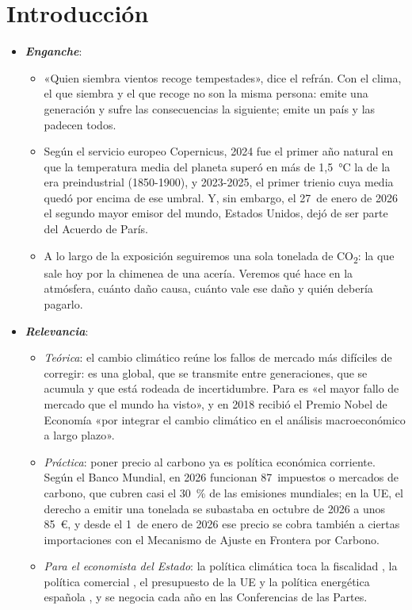 \documentclass[11pt]{article}
\begin{document}
\tceetitulo

\section*{Introducción}

\begin{itemize}
\item \textbf{\emph{Enganche}}:
  \begin{itemize}
  \item «Quien siembra vientos recoge tempestades», dice el refrán. Con el clima, el que siembra y el que recoge no son la misma persona: emite una generación y sufre las consecuencias la siguiente; emite un país y las padecen todos.
  \item Según el servicio europeo Copernicus, 2024 fue el primer año natural en que la temperatura media del planeta superó en más de 1,5~°C la de la era preindustrial (1850-1900), y 2023-2025, el primer trienio cuya media quedó por encima de ese umbral\nocite{C3S2026GCH2025}. Y, sin embargo, el 27~de enero de 2026 el segundo mayor emisor del mundo, Estados Unidos, dejó de ser parte del Acuerdo de París\nocite{ONU2025RetiradaParis}.
  \item A lo largo de la exposición seguiremos una sola tonelada de CO\textsubscript{2}: la que sale hoy por la chimenea de una acería. Veremos qué hace en la atmósfera, cuánto daño causa, cuánto vale ese daño y quién debería pagarlo.
  \end{itemize}

\item \textbf{\emph{Relevancia}}:
  \begin{itemize}
  \item \emph{Teórica}: el cambio climático reúne los fallos de mercado más difíciles de corregir: es una  global, que se transmite entre generaciones, que se acumula y que está rodeada de incertidumbre. Para  es «el mayor fallo de mercado que el mundo ha visto»\nocite{Stern2007Economics}, y en 2018  recibió el Premio Nobel de Economía «por integrar el cambio climático en el análisis macroeconómico a largo plazo»\nocite{Nobel2018Nordhaus}.
  \item \emph{Práctica}: poner precio al carbono ya es política económica corriente. Según el Banco Mundial, en 2026 funcionan 87~impuestos o mercados de carbono, que cubren casi el 30~\% de las emisiones mundiales\nocite{BM2026StateTrends}; en la UE, el derecho a emitir una tonelada se subastaba en octubre de 2026 a unos 85~€\nocite{EEX2026Subastas}, y desde el 1~de enero de 2026 ese precio se cobra también a ciertas importaciones con el Mecanismo de Ajuste en Frontera por Carbono\nocite{UE2023Reglamento956}.
  \item \emph{Para el economista del Estado}: la política climática toca la fiscalidad , la política comercial , el presupuesto de la UE  y la política energética española , y se negocia cada año en las Conferencias de las Partes.
  \end{itemize}


\end{itemize}
\end{document}
